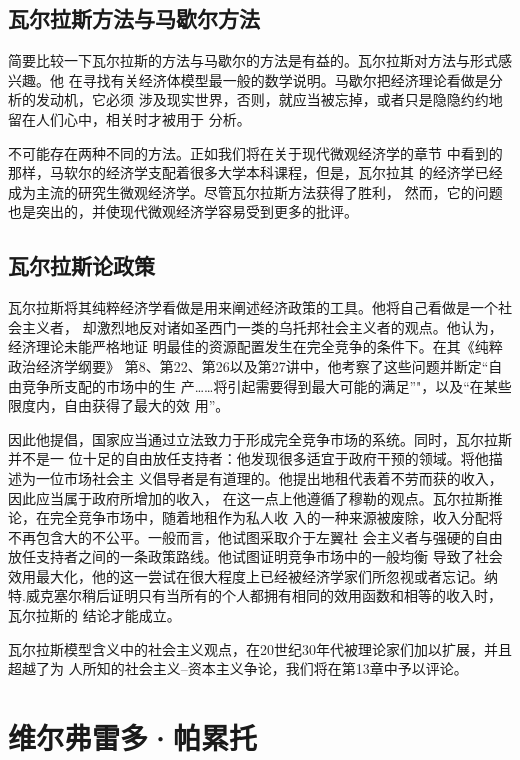\subsection{瓦尔拉斯方法与马歇尔方法}

简要比较一下瓦尔拉斯的方法与马歇尔的方法是有益的。瓦尔拉斯对方法与形式感兴趣。他
在寻找有关经济体模型最一般的数学说明。马歇尔把经济理论看做是分析的发动机，它必须
涉及现实世界，否则，就应当被忘掉，或者只是隐隐约约地留在人们心中，相关时才被用于
分析。

不可能存在两种不同的方法。正如我们将在关于现代微观经济学的章节
中看到的那样，马软尔的经济学支配着很多大学本科课程，但是，瓦尔拉其
的经济学已经成为主流的研究生微观经济学。尽管瓦尔拉斯方法获得了胜利，
然而，它的问题也是突出的，并使现代微观经济学容易受到更多的批评。

\subsection{瓦尔拉斯论政策}

瓦尔拉斯将其纯粹经济学看做是用来阐述经济政策的工具。他将自己看做是一个社会主义者，
却激烈地反对诸如圣西门一类的乌托邦社会主义者的观点。他认为，经济理论未能严格地证
明最佳的资源配置发生在完全竞争的条件下。在其《纯粹政治经济学纲要》
第8、第22、第26以及第27讲中，他考察了这些问题并断定“自由竞争所支配的市场中的生
产……将引起需要得到最大可能的满足”"，以及“在某些限度内，自由获得了最大的效
用”。

因此他提倡，国家应当通过立法致力于形成完全竞争市场的系统。同时，瓦尔拉斯并不是一
位十足的自由放任支持者：他发现很多适宜于政府干预的领域。将他描述为一位市场社会主
义倡导者是有道理的。他提出地租代表着不劳而获的收入，因此应当属于政府所增加的收入，
在这一点上他遵循了穆勒的观点。瓦尔拉斯推论，在完全竞争市场中，随着地租作为私人收
入的一种来源被废除，收入分配将不再包含大的不公平。一般而言，他试图采取介于左翼社
会主义者与强硬的自由放任支持者之间的一条政策路线。他试图证明竞争市场中的一般均衡
导致了社会效用最大化，他的这一尝试在很大程度上已经被经济学家们所忽视或者忘记。纳
特.威克塞尔稍后证明只有当所有的个人都拥有相同的效用函数和相等的收入时，瓦尔拉斯的
结论才能成立。

瓦尔拉斯模型含义中的社会主义观点，在20世纪30年代被理论家们加以扩展，并且超越了为
人所知的社会主义--资本主义争论，我们将在第13章中予以评论。

\section{维尔弗雷多·帕累托}

